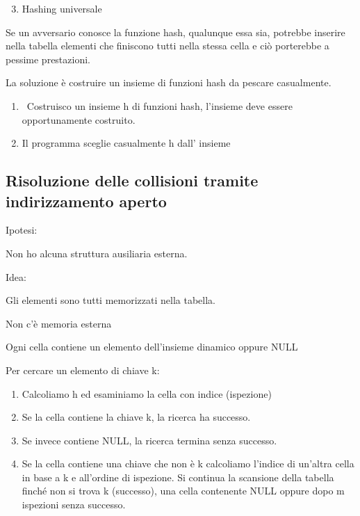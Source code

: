 \documentclass{article}
\providecommand{\tightlist}{%
  \setlength{\itemsep}{0pt}\setlength{\parskip}{0pt}}
\begin{document}
\begin{enumerate}
\setcounter{enumi}{2}
\tightlist
\item
  {Hashing universale}
\end{enumerate}

{}

{Se un avversario conosce la funzione hash, qualunque essa sia, potrebbe
inserire nella tabella elementi che finiscono tutti nella stessa cella e
ciò porterebbe a pessime prestazioni.}

{}

{La soluzione è costruire un insieme di funzioni hash da pescare
casualmente.}

{}

\begin{enumerate}
\tightlist
\item
  {~Costruisco un insieme h di funzioni hash, l'insieme deve essere
  opportunamente costruito.}
\item
  {Il programma sceglie casualmente h dall' insieme}
\end{enumerate}

\hypertarget{h.3fhh68cy94hw}{\subsection{\texorpdfstring{{Risoluzione
delle collisioni tramite indirizzamento
aperto}}{Risoluzione delle collisioni tramite indirizzamento aperto}}\label{h.3fhh68cy94hw}}

{Ipotesi: }

{Non ho alcuna struttura ausiliaria esterna.}

{}

{Idea:}

{Gli elementi sono tutti memorizzati nella tabella.}

{Non c'è memoria esterna}

{}

{Ogni cella contiene un elemento dell'insieme dinamico oppure NULL}

{}

{Per cercare un elemento di chiave k:}

\begin{enumerate}
\tightlist
\item
  {Calcoliamo h ed esaminiamo la cella con indice (ispezione)}
\item
  {Se la cella contiene la chiave k, la ricerca ha successo. }
\item
  {Se invece contiene NULL, la ricerca termina senza successo.}
\item
  {Se la cella contiene una chiave che non è k calcoliamo l'indice di
  un'altra cella in base a k e all'ordine di ispezione. Si continua la
  scansione della tabella finché non si trova k (successo), una cella
  contenente NULL oppure dopo m ispezioni senza successo.}
\end{enumerate}
\end{document}
